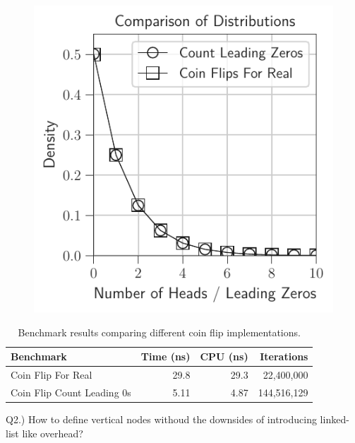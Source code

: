 \documentclass[12pt]{article}
\begin{document}
\begin{figure}[H]
\begin{minipage}{0.32\textwidth}
		\label{fig:coin_flips_count_leading}
	\end{minipage}\hfill
	\begin{minipage}{0.32\textwidth}
		\centering
		\includegraphics[width=\linewidth]{../notebook/plot/comparison_of_distributions.pdf}
		\label{fig:coin_flips_comparison}
	\end{minipage}
\end{figure}


\begin{table}[h]
	\centering
	\small
	\begin{tabular}{lrrr}
		\hline
		\textbf{Benchmark} & \textbf{Time (ns)} & \textbf{CPU (ns)} & \textbf{Iterations} \\
		\hline
		Coin Flip For Real & 29.8 & 29.3 & 22,400,000 \\
		\hline
		Coin Flip Count Leading 0s & 5.11 & 4.87 & 144,516,129 \\
	\end{tabular}
	\caption{Benchmark results comparing different coin flip implementations.}
	\label{tab:benchmark_results}
\end{table}


Q2.) How to define vertical nodes withoud the downsides of introducing linked-list like overhead? \\
\end{document}
